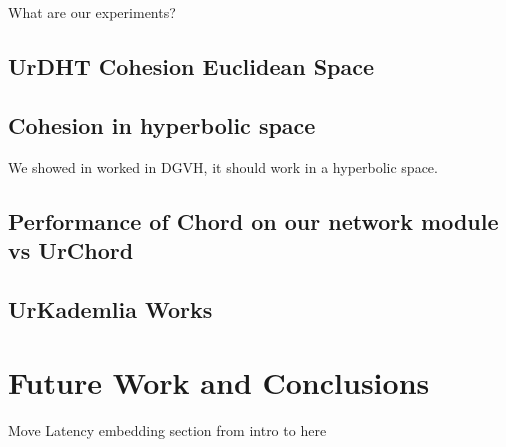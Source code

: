 \documentclass[11pt,conference]{IEEEtran}
\begin{document}
What are our experiments?

\subsection{UrDHT Cohesion Euclidean Space}



\subsection{Cohesion in hyperbolic space}
We showed in worked in DGVH, it should work in a hyperbolic space.


\subsection{Performance of Chord on our network module vs UrChord}


\subsection{UrKademlia Works}


\section{Future Work and Conclusions}
\label{sec:future}

Move Latency embedding section from intro to here




\end{document}
